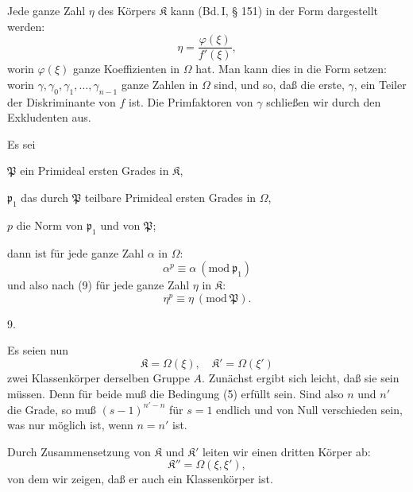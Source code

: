 Jede ganze Zahl $\eta$ des Körpers $\mathfrak{K}$ kann (Bd.\,I, § 151) in der
Form dargestellt werden:
\[
\eta = \frac{\varphi(\xi)}{f'(\xi)},
\]
worin $\varphi(\xi)$ ganze Koeffizienten in $\Omega$ hat. Man kann dies in die
Form setzen:
worin $\gamma, \gamma_0, \gamma_1, \ldots, \gamma_{n-1}$ ganze Zahlen in $\Omega$ sind, und so, daß die
erste, $\gamma$, ein Teiler der Diskriminante von $f$ ist. Die Primfaktoren von
$\gamma$ schließen wir durch den Exkludenten aus.

Es sei

$\mathfrak{P}$ ein Primideal ersten Grades in $\mathfrak{K}$,

$\mathfrak{p}_1$ das durch $\mathfrak{P}$ teilbare Primideal ersten Grades in $\Omega$,

$p$ die Norm von $\mathfrak{p}_1$ und von $\mathfrak{P}$;

dann ist für jede ganze Zahl $\alpha$ in $\Omega$:
\[
\alpha^p \equiv \alpha \ (\mathrm{mod}\ \mathfrak{p}_1)
\]
und
also nach (9) für jede ganze Zahl $\eta$ in $\mathfrak{K}$:
\[
\eta^p \equiv \eta \ (\mathrm{mod}\ \mathfrak{P}).
\]

9. 

Es seien nun
\[
\mathfrak{K} = \Omega(\xi), \quad \mathfrak{K}' = \Omega(\xi')
\]
zwei Klassenkörper derselben Gruppe $A$. Zunächst ergibt sich leicht, daß sie  sein müssen. Denn für beide muß die Bedingung (5) erfüllt sein. Sind also $n$ und $n'$ die Grade, so muß $(s-1)^{n'-n}$ für $s=1$ endlich und von Null verschieden sein, was nur möglich ist, wenn $n=n'$ ist.

Durch Zusammensetzung von $\mathfrak{K}$ und $\mathfrak{K}'$ leiten wir einen dritten Körper ab:
\[
\mathfrak{K}'' = \Omega(\xi, \xi'),
\]
von dem wir zeigen, daß er auch ein Klassenkörper ist.

